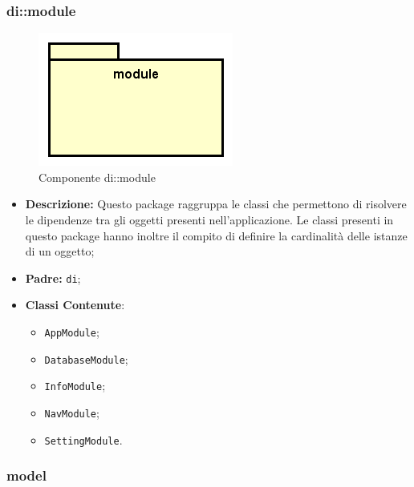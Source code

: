 \documentclass[../DefinizioneDiProdotto.tex]{subfiles}
\begin{document}
\subsubsection{di::\-module}

\begin{figure}[H]
	\centering
	\includegraphics[width=\maxwidth]{img/package/module.png}
	\caption{Componente di::\-module}\label{fig:di::module} 
\end{figure}
\begin{itemize}
	\item \textbf{Descrizione:} Questo package raggruppa le classi che permettono di risolvere le dipendenze tra gli oggetti presenti nell'applicazione. Le classi presenti in questo package hanno inoltre il compito di definire la cardinalità delle istanze di un oggetto;
	\item \textbf{Padre:} \texttt{di};
	\item \textbf{Classi Contenute}:
	\begin{itemize}
		\item \texttt{AppModule};
		
		\item \texttt{DatabaseModule};
		
		\item \texttt{InfoModule};
		
		\item \texttt{NavModule};
		
		\item \texttt{SettingModule}.
		
	\end{itemize}
\end{itemize}

\subsubsection{model}
\end{document}
